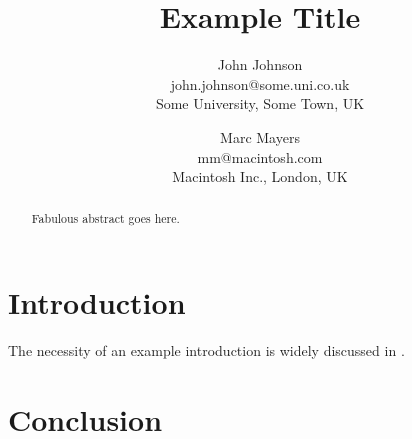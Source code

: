 \documentclass{gistt}
\title{Example Title}
\author{John Johnson\\
john.johnson@some.uni.co.uk\\
Some University, Some Town, UK
\and
Marc Mayers\\
mm@macintosh.com\\
Macintosh Inc., London, UK}
\begin{document}
\maketitle

\begin{abstract}
Fabulous abstract goes here.
\end{abstract}

%
\section{Introduction}

The necessity of an example introduction is widely discussed in \cite{Johnson:2003,Mayers:2004}.

%
\section{Conclusion}



\printbibliography
\end{document}
